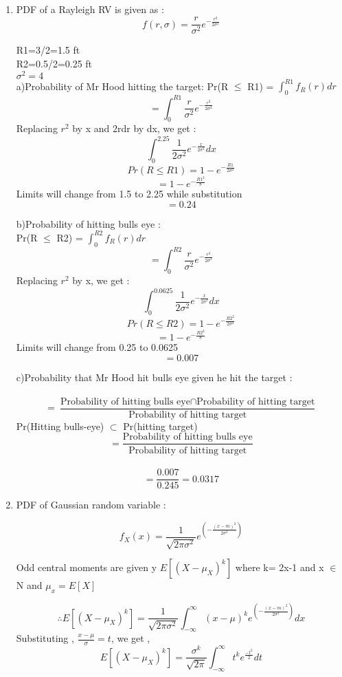 \documentclass{article}
\begin{document}
\begin{enumerate}
\item
  PDF of a Rayleigh RV is given as :
  \large $$f(r,\sigma) = \frac{r}{\sigma^2} e^{-\frac{r^2}{2\sigma^2}}$$

  R1=3/2=1.5 ft\\
  R2=0.5/2=0.25 ft \\
  $\sigma^2=4$\\
  \large
  a)Probability of Mr Hood hitting the target: Pr(R $\leq$ R1) = $\int_{0}^{R1}f_{R}(r)dr$\\
  $$=\int_{0}^{R1} \frac{r}{\sigma^2} e^{-\frac{r^2}{2\sigma^2}}$$
  Replacing $r^2$ by x and 2rdr by dx, we get :\\
  $$\int_{0}^{2.25}\frac{1}{2\sigma^2} e^{-\frac{x}{2\sigma^2}}dx$$
  $$Pr(R \leq R1) = 1-e^{-\frac{R1}{2\sigma^2}}$$
  $$= 1-e^{-\frac{R1^2}{8}}$$
  Limits will change from 1.5 to 2.25 while substitution\\
  $$= 0.24 $$

  b)Probability of hitting bulls eye :\\
  Pr(R $\leq$ R2) = $\int_{0}^{R2}f_{R}(r)dr$\\
  \large
  $$=\int_{0}^{R2} \frac{r}{\sigma^2} e^{-\frac{r^2}{2\sigma^2}}$$
  Replacing $r^2$ by x, we get :\\
  $$\int_{0}^{0.0625}\frac{1}{2\sigma^2} e^{-\frac{x}{2\sigma^2}}dx$$
  $$Pr(R \leq R2) = 1-e^{-\frac{R2^2}{2\sigma^2}}$$
  $$= 1-e^{-\frac{R2^2}{8}}$$
  Limits will change from 0.25 to 0.0625\\
  $$= 0.007 $$

  c)Probability that Mr Hood hit bulls eye given he hit the target :\\ \\
  \large $$= \frac{\text{Probability of hitting bulls eye} \cap \text{Probability of hitting target}}{\text{Probability of hitting target}}$$
  Pr(Hitting bulls-eye) $\subset $ Pr(hitting target)
  \large$$ = \frac{\text{Probability of hitting bulls eye}}{\text{Probability of hitting target}} $$
  \\
  \large$$ = \frac{0.007}{0.245} = 0.0317$$
  \newpage
\item
  PDF of Gaussian random variable :

  $$f_{X}(x)= \frac{1}{\sqrt{2\pi\sigma^2}}e^{(-\frac{(x-m)^2}{2\sigma^2})}$$

  Odd central moments are given y $E[(X-\mu_{X})^k]$ where k= 2x-1 and x $\in$ N and $\mu_{x}=E[X]$

  $$\therefore E[(X-\mu_{X})^k] = \frac{1}{\sqrt{2\pi\sigma^2}} \int_{-\infty}^{\infty} (x-\mu)^k  e^{(-\frac{(x-m)^2}{2\sigma^2})} dx$$
  Substituting , $\frac{x-\mu}{\sigma}=t$, we get ,
  $$E[(X-\mu_{X})^k] = \frac{\sigma^k}{\sqrt{2\pi}}\int_{-\infty}^{\infty} t^{k} e^{\frac{-t^2}{2}} dt$$


\end{enumerate}
\end{document}
